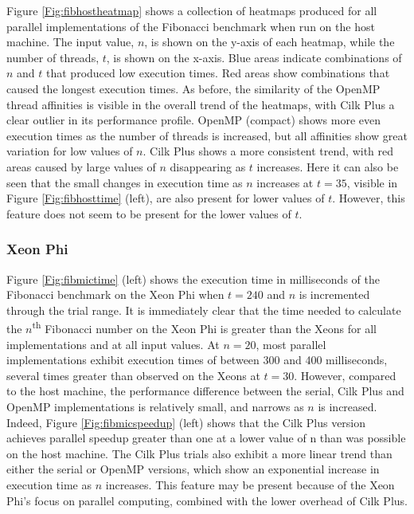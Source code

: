 \documentclass{report}
\begin{document}
Figure \ref{Fig:fibhostheatmap} shows a collection of heatmaps produced for all parallel implementations of the Fibonacci benchmark when run on the host machine. The input value, \(n\), is shown on the y-axis of each heatmap, while the number of threads, \(t\), is shown on the x-axis. Blue areas indicate combinations of \(n\) and \(t\) that produced low execution times. Red areas show combinations that caused the longest execution times. As before, the similarity of the OpenMP thread affinities is visible in the overall trend of the heatmaps, with Cilk Plus a clear outlier in its performance profile. OpenMP (compact) shows more even execution times as the number of threads is increased, but all affinities show great variation for low values of \(n\). Cilk Plus shows a more consistent trend, with red areas caused by large values of \(n\) disappearing as \(t\) increases. Here it can also be seen that the small changes in execution time as \(n\) increases at \(t=35\), visible in Figure \ref{Fig:fibhosttime} (left), are also present for lower values of \(t\). However, this feature does not seem to be present for the lower values of \(t\).

\subsubsection{Xeon Phi}

Figure \ref{Fig:fibmictime} (left) shows the execution time in milliseconds of the Fibonacci benchmark on the Xeon Phi when \(t=240\) and \(n\) is incremented through the trial range. It is immediately clear that the time needed to calculate the \(n\)\textsuperscript{th} Fibonacci number on the Xeon Phi is greater than the Xeons for all implementations and at all input values. At \(n=20\), most parallel implementations exhibit execution times of between 300 and 400 milliseconds, several times greater than observed on the Xeons at \(t=30\). However, compared to the host machine, the performance difference between the serial, Cilk Plus and OpenMP implementations is relatively small, and narrows as \(n\) is increased. Indeed, Figure \ref{Fig:fibmicspeedup} (left) shows that the Cilk Plus version achieves parallel speedup greater than one at a lower value of n than was possible on the host machine. The Cilk Plus trials also exhibit a more linear trend than either the serial or OpenMP versions, which show an exponential increase in execution time as \(n\) increases. This feature may be present because of the Xeon Phi's focus on parallel computing, combined with the lower overhead of Cilk Plus.
\end{document}
